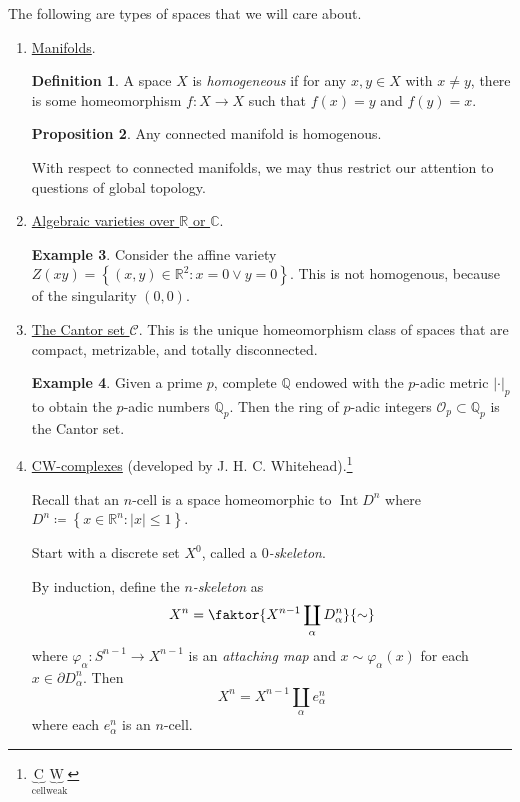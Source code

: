 \documentclass[10pt,letterpaper,cm]{nupset}
\theoremstyle{definition}
\newtheorem{definition}{Definition}[subsection]
\newtheorem{exmp}[definition]{Example}
\theoremstyle{theorem}
\newtheorem{prop}[definition]{Proposition}
\theoremstyle{remark}
\newcommand{\C}{\mathbb C}
\newcommand{\Q}{\mathbb Q}
\newcommand{\R}{\mathbb{R}}
\newcommand{\1}{\mathbb{1}}
\newcommand{\0}{\vec 0}
\DeclareMathOperator{\Int}{Int}
\begin{document}
The following are types of spaces that we will care about.
\begin{enumerate}
\item \underline{Manifolds}.
\begin{definition}
A space $X$ is \textit{homogeneous} if for any $x,y \in X$ with $x\ne y$, there is some homeomorphism $f: X \to X$ such that $f(x)= y$ and $f(y) =x$.
\end{definition}
\begin{prop}
Any connected manifold is homogenous. 
\end{prop}
With respect to connected manifolds, we may thus restrict our attention to questions of global topology.
\item \underline{Algebraic varieties over $\R$ or $\C$}.
\begin{exmp}
Consider the affine variety $Z(xy) =\left\{(x, y) \in \R^2 : x=0 \lor y=0\right\}$. This is not homogenous, because of the singularity $(0,0)$.  
\end{exmp}
\item \underline{The Cantor set $\mathcal{C}$}. This is the unique homeomorphism class of spaces that are compact, metrizable, and totally disconnected. 
\begin{exmp}
Given a prime $p$, complete $\Q$ endowed with the $p$-adic metric $\left\lvert{\cdot}\right\rvert_p$ to obtain the $p$-adic numbers $\Q_p$. Then the ring of $p$-adic integers $\mathcal{O}_p \subset \Q_p$ is the Cantor set.
\end{exmp}
\item \underline{CW-complexes} (developed by J. H. C. Whitehead).\footnote{$ \underbrace{\text{C}}_{\text{cell}}\underbrace{\text{W}}_{\text{weak}} $} 

Recall that an $n$-cell is a space homeomorphic to $\Int{D^n}$ where $D^n \coloneqq  \left\{x \in \R^n : \left\lvert{x}\right\rvert \leq 1\right\}$.

Start with a discrete set $X^0$, called a \textit{$0$-skeleton}. 

By induction, define the \textit{$n$-skeleton} as $$X^n = \faktor{X^{n-1} \coprod_{\alpha} D^n_{\alpha}}{\sim}$$ where $\varphi_{\alpha}: S^{n-1} \to X^{n-1}$ is an \textit{attaching map} and $x\sim \varphi_{\alpha}(x)$ for each $x\in \partial{D^n_{\alpha}}$. Then $$X^n = X^{n-1} \coprod_{\alpha} e^n_{\alpha}$$ where each $e^n_{\alpha}$ is an $n$-cell.


\end{enumerate}
\end{document}
